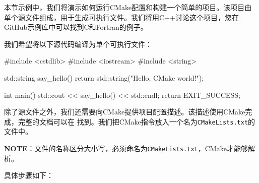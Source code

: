 本节示例中，我们将演示如何运行CMake配置和构建一个简单的项目。该项目由单个源文件组成，用于生成可执行文件。我们将用C++讨论这个项目，您在GitHub示例库中可以找到C和Fortran的例子。


我们希望将以下源代码编译为单个可执行文件：

\begin{codebox}[cpp]
#include <cstdlib>
#include <iostream>
#include <string>

std::string say_hello() { return std::string("Hello, CMake world!"); }

int main() {
  std::cout << say_hello() << std::endl;
  return EXIT_SUCCESS;
}
\end{codebox}


除了源文件之外，我们还需要向CMake提供项目配置描述。该描述使用CMake完成，完整的文档可以在  找到。我们把CMake指令放入一个名为\texttt{CMakeLists.txt}的文件中。

\begin{myInfoBox}
\textbf{NOTE}：文件的名称区分大小写，必须命名为\texttt{CMakeLists.txt}，CMake才能够解析。
\end{myInfoBox}

具体步骤如下：

